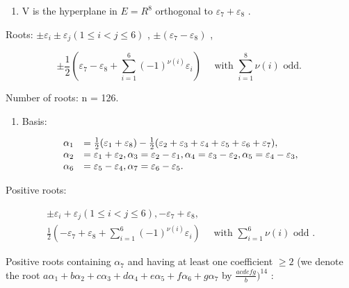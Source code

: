 
\begin{enumerate}
\def\labelenumi{(\Roman{enumi})}
\tightlist
\item
  V is the hyperplane in \(E = R^{8}\) orthogonal to \(\varepsilon_{7} + \varepsilon_{8}\) .
\end{enumerate}

Roots: \(\pm \varepsilon_{i} \pm \varepsilon_{j} (1 \leqslant i < j \leqslant 6)\) , \(\pm (\varepsilon_{7} - \varepsilon_{8})\) ,

\[
\pm \frac {1}{2} (\varepsilon_ {7} - \varepsilon_ {8} + \sum_ {i = 1} ^ {6} (- 1) ^ {\nu (i)} \varepsilon_ {i}) \quad \text { with } \sum_ {i = 1} ^ {8} \nu (i) \text { odd. }
\]

Number of roots: n = 126.

\begin{enumerate}
\def\labelenumi{(\Roman{enumi})}
\setcounter{enumi}{1}
\tightlist
\item
  Basis:
\end{enumerate}

\[
\begin{array}{r l} \alpha_ {1} & = \frac {1}{2} (\varepsilon_ {1} + \varepsilon_ {8}) - \frac {1}{2} (\varepsilon_ {2} + \varepsilon_ {3} + \varepsilon_ {4} + \varepsilon_ {5} + \varepsilon_ {6} + \varepsilon_ {7}), \\ \alpha_ {2} & = \varepsilon_ {1} + \varepsilon_ {2}, \alpha_ {3} = \varepsilon_ {2} - \varepsilon_ {1}, \alpha_ {4} = \varepsilon_ {3} - \varepsilon_ {2}, \alpha_ {5} = \varepsilon_ {4} - \varepsilon_ {3}, \\ \alpha_ {6} & = \varepsilon_ {5} - \varepsilon_ {4}, \alpha_ {7} = \varepsilon_ {6} - \varepsilon_ {5}. \end{array}
\]

Positive roots:

\[
\begin{array}{c} \pm \varepsilon_ {i} + \varepsilon_ {j} (1 \leqslant i <   j \leqslant 6), - \varepsilon_ {7} + \varepsilon_ {8}, \\ \frac {1}{2} (- \varepsilon_ {7} + \varepsilon_ {8} + \sum_ {i = 1} ^ {6} (- 1) ^ {\nu (i)} \varepsilon_ {i}) \quad \text { with } \sum_ {i = 1} ^ {6} \nu (i) \text { odd }. \end{array}
\]

Positive roots containing \(\alpha_{7}\) and having at least one coefficient \(\geqslant 2\) (we denote the root \(a\alpha_{1} + b\alpha_{2} + c\alpha_{3} + d\alpha_{4} + e\alpha_{5} + f\alpha_{6} + g\alpha_{7}\) by \(\frac{a c d e f g}{b})^{14}\) :

